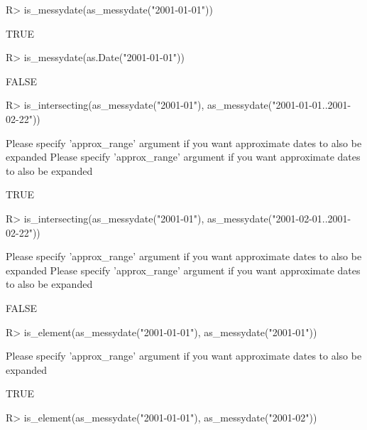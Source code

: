 \documentclass[
]{jss}
\begin{document}
\begin{CodeChunk}
\begin{CodeInput}
R> is_messydate(as_messydate("2001-01-01"))
\end{CodeInput}
\begin{CodeOutput}
[1] TRUE
\end{CodeOutput}
\begin{CodeInput}
R> is_messydate(as.Date("2001-01-01"))
\end{CodeInput}
\begin{CodeOutput}
[1] FALSE
\end{CodeOutput}
\begin{CodeInput}
R> is_intersecting(as_messydate("2001-01"), as_messydate("2001-01-01..2001-02-22"))
\end{CodeInput}
\begin{CodeOutput}
Please specify 'approx_range' argument if you want approximate dates to also be expanded
Please specify 'approx_range' argument if you want approximate dates to also be expanded
\end{CodeOutput}
\begin{CodeOutput}
[1] TRUE
\end{CodeOutput}
\begin{CodeInput}
R> is_intersecting(as_messydate("2001-01"), as_messydate("2001-02-01..2001-02-22"))
\end{CodeInput}
\begin{CodeOutput}
Please specify 'approx_range' argument if you want approximate dates to also be expanded
Please specify 'approx_range' argument if you want approximate dates to also be expanded
\end{CodeOutput}
\begin{CodeOutput}
[1] FALSE
\end{CodeOutput}
\begin{CodeInput}
R> is_element(as_messydate("2001-01-01"), as_messydate("2001-01"))
\end{CodeInput}
\begin{CodeOutput}
Please specify 'approx_range' argument if you want approximate dates to also be expanded
\end{CodeOutput}
\begin{CodeOutput}
[1] TRUE
\end{CodeOutput}
\begin{CodeInput}
R> is_element(as_messydate("2001-01-01"), as_messydate("2001-02"))
\end{CodeInput}
\begin{CodeOutput}

\end{CodeOutput}
\end{CodeChunk}
\end{document}
